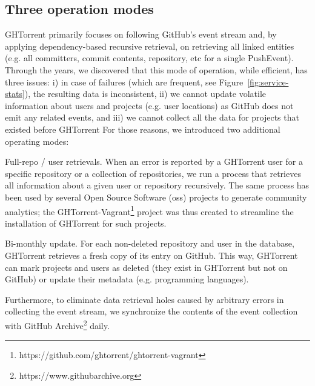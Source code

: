 \documentclass{sig-alternate}
\begin{document}
\subsection{Three operation modes}

GHTorrent primarily focuses on following GitHub's event stream and, by applying
dependency-based recursive retrieval, on retrieving all linked entities (e.g.  all
committers, commit contents, repository, etc for a single PushEvent).
Through the years, we discovered that this mode of operation, while efficient,
has three issues: i) in case of failures (which are frequent, see
Figure~\ref{fig:service-stats}), the resulting data is inconsistent,
ii) we cannot update volatile information about users and projects (e.g. user
locations) as GitHub does not emit any related events, and
iii) we cannot collect all the data for projects that existed before GHTorrent
For those reasons, we introduced two additional operating modes:

\begin{compactdesc}

  \item[Full-repo / user retrievals.] When an error is reported by a GHTorrent
    user for a specific repository or a collection of repositories, we run a
    process that retrieves all information about a given user or repository
    recursively. The same process has been used by several Open Source Software
    ({\sc oss}) projects to generate community analytics; the
    GHTorrent-Vagrant\footnote{https://github.com/ghtorrent/ghtorrent-vagrant}
    project was thus created to streamline the installation of GHTorrent for
    such projects.

  \item[Bi-monthly update.] For each non-deleted repository and user in the
    database, GHTorrent retrieves a fresh copy of its entry on GitHub. This way,
    GHTorrent can mark projects and users as deleted (they exist in GHTorrent
    but not on GitHub) or update their metadata (e.g. programming
    languages).

\end{compactdesc}

Furthermore, to eliminate data retrieval holes caused by arbitrary errors in
collecting the event stream, we synchronize the contents of the event collection
with GitHub Archive\footnote{https://www.githubarchive.org} daily.
\end{document}
